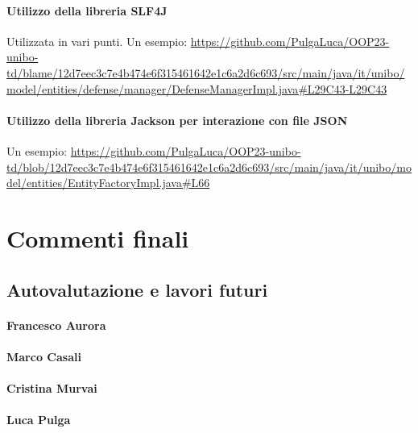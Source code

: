 \documentclass[a4paper,12pt]{report}
\begin{document}
\subsubsection{Utilizzo della libreria SLF4J}
Utilizzata in vari punti. Un esempio:  
\url{https://github.com/PulgaLuca/OOP23-unibo-td/blame/12d7eec3c7e4b474e6f315461642e1c6a2d6c693/src/main/java/it/unibo/model/entities/defense/manager/DefenseManagerImpl.java#L29C43-L29C43}

\subsubsection{Utilizzo della libreria Jackson per interazione con file JSON}
Un esempio:  
\url{https://github.com/PulgaLuca/OOP23-unibo-td/blob/12d7eec3c7e4b474e6f315461642e1c6a2d6c693/src/main/java/it/unibo/model/entities/EntityFactoryImpl.java#L66}



\chapter{Commenti finali}
\section{Autovalutazione e lavori futuri}
\subsubsection{Francesco Aurora}
\subsubsection{Marco Casali}
\subsubsection{Cristina Murvai}
\subsubsection{Luca Pulga}
\end{document}
